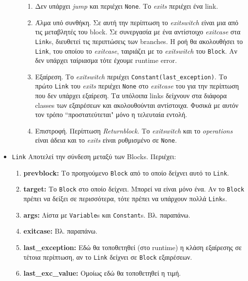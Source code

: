 \begin{itemize}
\begin{enumerate}
\begin{enumerate}
\item Δεν υπάρχει \textit{jump} και περιέχει \texttt{None}. Το \textit{exits}
περιέχει ένα link.
\item Άλμα υπό συνθήκη. Σε αυτή την περίπτωση το \textit{exitswitch} είναι μια
από τις μεταβλητές του block. Σε συνεργασία με ένα αντίστοιχο
\textit{exitcase} στα \texttt{Link}s, διευθετεί τις περιπτώσεις των branches.
Η ροή θα ακολουθήσει το \texttt{Link}, του οποίου το \textit{exitcase},
ταιριάζει με το \textit{exitswitch} του \texttt{Block}. Αν δεν υπάρχει 
ταίριασμα τότε έχουμε runtime error.
\item Εξαίρεση. Το \textit{exitswitch} περιέχει
\texttt{Constant(last\_exception)}. Το πρώτο \texttt{Link} του \textit{exits}
περιέχει \texttt{None} στο \textit{exitcase} του για την περίπτωση που δεν
υπάρχει εξαίρεση. Τα υπόλοιπα links δείχνουν στα διάφορα classes των εξαιρέσεων
και ακολουθούνται αντίστοιχα. Φυσικά με αυτόν τον τρόπο ``προστατεύτεται" μόνο η
τελευταία εντολή.
\item Επιστροφή. Περίπτωση \textit{Returnblock}. Το \textit{exitswitch}
και το \textit{operations} είναι άδεια και το \textit{exits} είναι ρυθμισμένο 
σε \texttt{None}.
\end{enumerate}

\end{enumerate}

\item \texttt{Link} Αποτελεί την σύνδεση μεταξύ των Blocks. Περιέχει:

\begin{enumerate}
\item \textbf{prevblock:} Το προηγούμενο \texttt{Block} από το οποίο δείχνει 
αυτό το \texttt{Link}.
\item \textbf{target:} Το \texttt{Block} στο οποίο δείχνει. Μπορεί να είναι 
μόνο ένα. Αν το \texttt{Block} πρέπει να δείξει σε περισσότερα, τότε πρέπει να 
υπάρχουν πολλά \texttt{Link}s.
\item \textbf{args:} Λίστα με \texttt{Variable}s και \texttt{Constant}s. Βλ. 
παραπάνω.
\item \textbf{exitcase:} Βλ. παραπάνω.
\item \textbf{last\_exception:} Εδώ θα τοποθετηθεί (στο runtime) η κλάση 
εξαίρεσης σε τέτοια περίπτωση, αν το \texttt{Link} δείχνει σε \texttt{Block} 
εξαιρέσεων.
\item \textbf{last\_exc\_value:} Ομοίως εδώ θα τοποθετηθεί η τιμή.
\end{enumerate}


\end{itemize}
